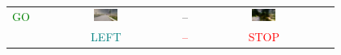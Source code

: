 \begin{samepage}
\begin{table}[h]
\begin{tabular}{c|c|c|c}
\textcolor{green}{GO} &
\includegraphics[width=0.18\textwidth]{img/appendix/grid_reconstructed_town7_010910.png} &
-- &
\includegraphics[width=0.18\textwidth]{img/appendix/LIME_on_Image_reconstructed_town7_010910.png} \\

& \textcolor{teal}{LEFT} & \textcolor{red}{--} & \textcolor{red}{STOP} \\

\bottomrule

\end{tabular}
\end{table}
\end{samepage}



\clearpage


